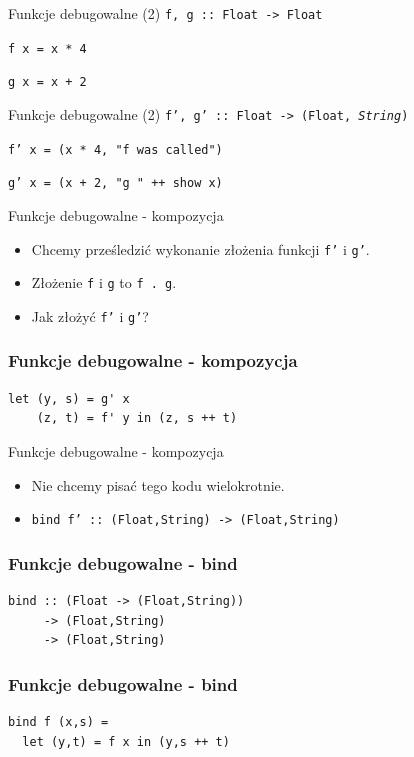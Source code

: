 \documentclass[14pt]{beamer}
\begin{document}
\begin{frame}{Funkcje debugowalne (2)}
    \texttt{f, g :: Float -> Float}
    \pause

    \texttt{f x = x * 4}

    \texttt{g x = x + 2}
\end{frame}

\begin{frame}{Funkcje debugowalne (2)}
    \texttt{f', g' :: Float -> (Float, \emph{String})}
    \pause

    \texttt{f' x = (x * 4, "f was called")}

    \texttt{g' x = (x + 2, "g " ++ show x)}
\end{frame}

\begin{frame}{Funkcje debugowalne - kompozycja}
    \begin{itemize}
        \item Chcemy prześledzić wykonanie złożenia funkcji \texttt{f'}
            i \texttt{g'}.
        \item Złożenie \texttt{f} i \texttt{g} to \texttt{f . g}.
        \item Jak złożyć \texttt{f'} i \texttt{g'}?
    \end{itemize}
\end{frame}

\begin{frame}[fragile]
\frametitle{Funkcje debugowalne - kompozycja}
\begin{verbatim}
let (y, s) = g' x
    (z, t) = f' y in (z, s ++ t)
\end{verbatim}
\end{frame}

\begin{frame}{Funkcje debugowalne - kompozycja}
    \begin{itemize}
        \item Nie chcemy pisać tego kodu wielokrotnie.
        \item \texttt{bind f' :: (Float,String) -> (Float,String)}
    \end{itemize}
\end{frame}

\begin{frame}[fragile]
\frametitle{Funkcje debugowalne - bind}
\begin{verbatim}
bind :: (Float -> (Float,String))
     -> (Float,String)
     -> (Float,String)
\end{verbatim}
\end{frame}

\begin{frame}[fragile]
\frametitle{Funkcje debugowalne - bind}
\begin{verbatim}
bind f (x,s) =
  let (y,t) = f x in (y,s ++ t)
\end{verbatim}
\end{frame}
\end{document}
